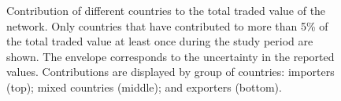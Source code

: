 \documentclass[
  authoryear,
  review,
  3p]{elsarticle}
\begin{document}
\begin{figure}[p]


\caption{\label{fig-network-contribution}Contribution of different
countries to the total traded value of the network. Only countries that
have contributed to more than 5\% of the total traded value at least
once during the study period are shown. The envelope corresponds to the
uncertainty in the reported values. Contributions are displayed by group
of countries: importers (top); mixed countries (middle); and exporters
(bottom).}

\end{figure}%
\end{document}
